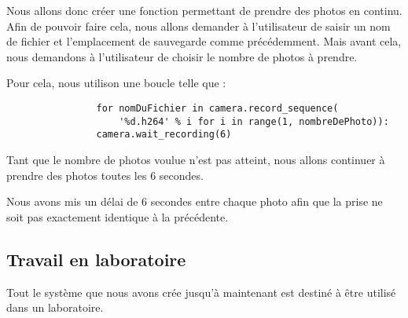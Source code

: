 \begin{flushleft}
            \vspace{0.2cm}

            Nous allons donc créer une fonction permettant de prendre des photos en continu.
            Afin de pouvoir faire cela, nous allons demander à l'utilisateur de saisir un nom de fichier et l'emplacement de sauvegarde comme précédemment.
            Mais avant cela, nous demandons à l'utilisateur de choisir le nombre de photos à prendre.

            \vspace{0.2cm}

            Pour cela, nous utilison une boucle telle que : 
            \begin{verbatim}
                for nomDuFichier in camera.record_sequence(
                    '%d.h264' % i for i in range(1, nombreDePhoto)):
                camera.wait_recording(6)
            \end{verbatim}

            Tant que le nombre de photos voulue n'est pas atteint, nous allons continuer à prendre des photos toutes les 6 secondes.

            \vspace{0.2cm}

            Nous avons mis un délai de 6 secondes entre chaque photo afin que la prise ne soit pas exactement identique à la précédente.
        \end{flushleft}

        

        \subsection{Travail en laboratoire}
        Tout le système que nous avons crée jusqu'à maintenant est destiné à être utilisé dans un laboratoire.


